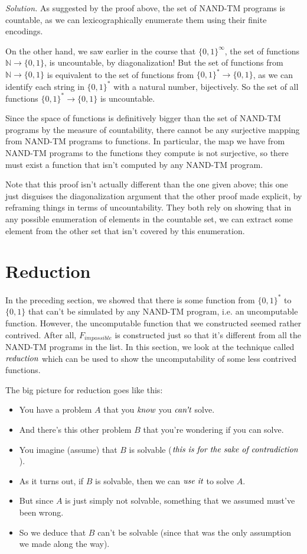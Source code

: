 \documentclass[11pt]{article}
\theoremstyle{definition}
\theoremstyle{remark}
\begin{document}
\emph{Solution.} 
As suggested by the proof above, the set of NAND-TM programs is countable, as we can lexicographically enumerate them using their finite encodings.

On the other hand, we saw earlier in the course that $\{0,1\}^\infty$, the set of functions $\mathbb{N} \to \{0,1\}$, is uncountable, by diagonalization! But the set of functions from $\mathbb{N} \to \{0,1\}$ is equivalent to the set of functions from $\{0,1\}^* \to \{0,1\}$, as we can identify each string in $\{0,1\}^*$ with a natural number, bijectively. So the set of all functions $\{0,1\}^* \to \{0,1\}$ is uncountable.

Since the space of functions is definitively bigger than the set of NAND-TM programs by the measure of countability, there cannot be any surjective mapping from NAND-TM programs to functions. In particular, the map we have from NAND-TM programs to the functions they compute is not surjective, so there must exist a function that isn't computed by any NAND-TM program.

Note that this proof isn't actually different than the one given above; this one just disguises the diagonalization argument that the other proof made explicit, by reframing things in terms of uncountability. They both rely on showing that in any possible enumeration of elements in the countable set, we can extract some element from the other set that isn't covered by this enumeration. 

\section{Reduction}
In the preceding section, we showed that there is some function from $\{0, 1\}^*$ to $\{0, 1\}$ that can't be simulated by
any NAND-TM program, i.e. an uncomputable function. However, the uncomputable function that we constructed seemed rather contrived.
After all, $F_{impossible}$ is constructed just so that it's different from all the NAND-TM programs in the list. In this section,
we look at the technique called $\emph{reduction}$ which can be used to show the uncomputability of some less contrived functions.

The big picture for reduction goes like this:
\begin{itemize}
    \item{
            You have a problem $A$ that you $\emph{know}$ you $\emph{can't}$ solve.
        }
    \item{
        And there's this other problem $B$ that you're wondering if you can solve.
        }
    \item{
            You imagine (assume) that $B$ is solvable ($\emph{this is for the sake of contradiction}$).
        }
    \item{
        As it turns out, if $B$ is solvable, then we can $\emph{use it}$ to solve $A$.
        }
    \item{
        But since $A$ is just simply not solvable, something that we assumed must've been wrong.
        }
    \item{
        So we deduce that $B$ can't be solvable (since that was the only assumption we made along the way).
        }
\end{itemize}
\end{document}
